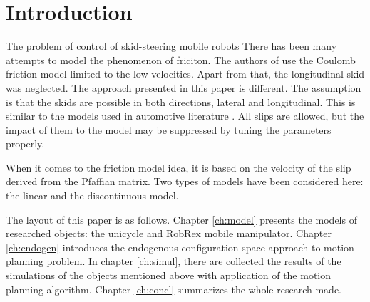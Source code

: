 \chapter{Introduction}

The problem of control of skid-steering mobile robots 
There has been many attempts to model the phenomenon of friciton. 
The authors of \cite{caracciolo1999trajectory} use the Coulomb friction model limited to the low velocities.
Apart from that, the longitudinal skid was neglected. The approach presented in this paper is different.
The assumption is that the skids are possible in both directions, lateral and longitudinal.
This is similar to the models used in automotive literature \cite{pacejka2005tyre}.
All slips are allowed, but the impact of them to the model may be suppressed by tuning the
parameters properly. 

When it comes to the friction model idea, it is based on the velocity of the slip derived
from the Pfaffian matrix. %
Two types of models have been considered here: the linear and the discontinuous model.


The layout of this paper is as follows. Chapter \ref{ch:model} presents the models of researched
objects: the unicycle and RobRex mobile manipulator. Chapter \ref{ch:endogen} introduces the endogenous
configuration space approach to motion planning problem. In chapter \ref{ch:simul}, there are collected
the results of the simulations of the objects mentioned above with application of the motion
planning algorithm. Chapter \ref{ch:concl} summarizes the whole research made.